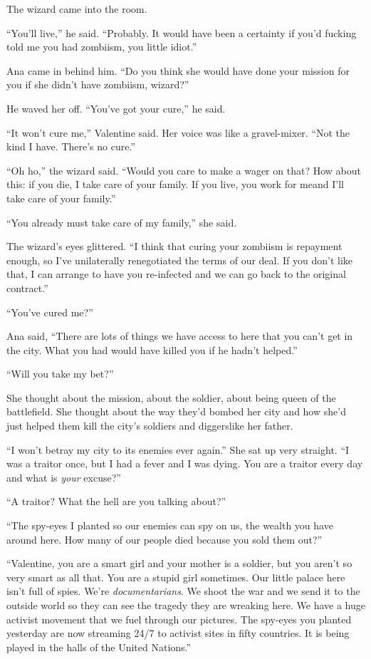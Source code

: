 The wizard came into the room.

“You’ll live,” he said. “Probably. It would have been a certainty
if you’d fucking told me you had zombiism, you little idiot.”

Ana came in behind him. “Do you think she would have done your
mission for you if she didn’t have zombiism, wizard?”

He waved her off. “You’ve got your cure,” he said.

“It won’t cure me,” Valentine said. Her voice was like a
gravel-mixer. “Not the kind I have. There’s no cure.”

“Oh ho,” the wizard said. “Would you care to make a wager on that?
How about this: if you die, I take care of your family. If you
live, you work for me\dash{}and I’ll take care of your family.”

“You already must take care of my family,” she said.

The wizard’s eyes glittered. “I think that curing your zombiism is
repayment enough, so I’ve unilaterally renegotiated the terms of
our deal. If you don’t like that, I can arrange to have you
re-infected and we can go back to the original contract.”

“You’ve cured me?”

Ana said, “There are lots of things we have access to here that you
can’t get in the city. What you had would have killed you if he
hadn’t helped.”

“Will you take my bet?”

She thought about the mission, about the soldier, about being queen
of the battlefield. She thought about the way they’d bombed her
city and how she’d just helped them kill the city’s soldiers and
diggers\dash{}like her father.

“I won’t betray my city to its enemies ever again.” She sat up very
straight. “I was a traitor once, but I had a fever and I was dying.
You are a traitor every day and what is \emph{your} excuse?”

“A traitor? What the hell are you talking about?”

“The spy-eyes I planted so our enemies can spy on us, the wealth
you have around here. How many of our people died because you sold
them out?”

“Valentine, you are a smart girl and your mother is a soldier, but
you aren’t so very smart as all that. You are a stupid girl
sometimes. Our little palace here isn’t full of spies. We’re
\emph{documentarians}. We shoot the war and we send it to the
outside world so they can see the tragedy they are wreaking here.
We have a huge activist movement that we fuel through our pictures.
The spy-eyes you planted yesterday are now streaming 24/7 to
activist sites in fifty countries. It is being played in the halls
of the United Nations.”

